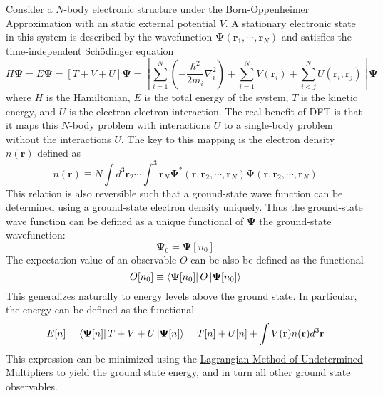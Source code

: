 \documentclass[12pt]{article}
\newcommand{\lrp}[1]{\left( #1 \right)}
\newcommand{\lrb}[1]{\left[ #1 \right]}
\begin{document}
Consider a $N$-body electronic structure under the \href{https://en.wikipedia.org/wiki/Born\%E2\%80\%93Oppenheimer_approximation}{Born-Oppenheimer Approximation} with an static external potential $V$. A stationary electronic state in this system is described by the wavefunction $\boldsymbol{\Psi}(\textbf{r}_1,\cdots,\textbf{r}_N)$ and satisfies the time-independent Sch\"odinger equation
\begin{equation*}
    H\boldsymbol{\Psi} = E\boldsymbol{\Psi} = \lrb{T+V+U}\boldsymbol{\Psi} = \lrb{\sum_{i=1}^N \lrp{-\frac{\hbar^2}{2m_i}\nabla_i^2}+\sum_{i=1}^N V(\textbf{r}_i) + \sum_{i<j}^N U(\textbf{r}_i,\textbf{r}_j)}\boldsymbol{\Psi} 
\end{equation*}
where $H$ is the Hamiltonian, $E$ is the total energy of the system, $T$ is the kinetic energy, and $U$ is the electron-electron interaction. The real benefit of DFT is that it maps this $N$-body problem with interactions $U$ to a single-body problem without the interactions $U$. The key to this mapping is the electron density $n(\textbf{r})$ defined as
\begin{equation*}
    n(\textbf{r}) \equiv N\int d^3\textbf{r}_2 \cdots \int ^3\textbf{r}_N \boldsymbol{\Psi}^*(\textbf{r},\textbf{r}_2,\cdots,\textbf{r}_N)\boldsymbol{\Psi}(\textbf{r},\textbf{r}_2,\cdots,\textbf{r}_N)
\end{equation*}
This relation is also reversible such that a ground-state wave function can be determined using a ground-state electron density uniquely. Thus the ground-state wave function can be defined as a unique functional of $\boldsymbol{\Psi}$ the ground-state wavefunction:
\begin{equation*}
    \boldsymbol{\Psi}_0 = \boldsymbol{\Psi}[n_0]
\end{equation*}
The expectation value of an observable $O$ can be also be defined as the functional
\begin{equation*}
    O[n_0] \equiv \bra{\boldsymbol{\Psi}[n_0]}O\ket{\boldsymbol{\Psi}[n_0]}
\end{equation*}
This generalizes naturally to energy levels above the ground state. In particular, the energy can be defined as the functional
\begin{equation}\label{eq:Enfunc}
    E[n] = \bra{\boldsymbol{\Psi}[n]}T+V+U\ket{\boldsymbol{\Psi}[n]} = T[n] + U[n] + \int V(\textbf{r})n(\textbf{r})d^3\textbf{r}
\end{equation}
This expression can be minimized using the \href{https://en.wikipedia.org/wiki/Lagrange_multiplier}{Lagrangian Method of Undetermined Multipliers} to yield the ground state energy, and in turn all other ground state observables.
\end{document}
